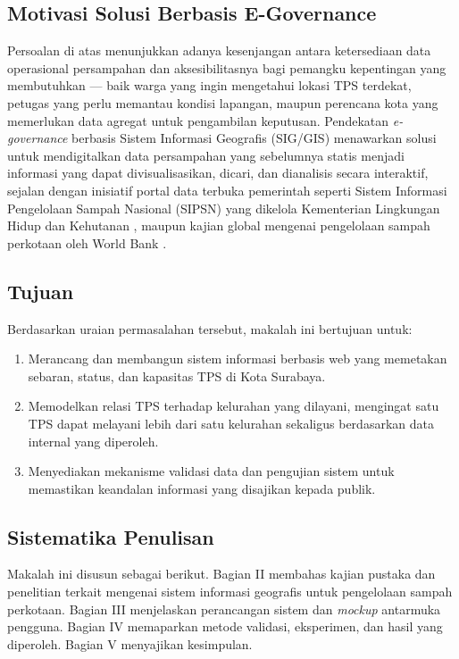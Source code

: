 \documentclass[conference]{IEEEtran}
\begin{document}
\subsection{Motivasi Solusi Berbasis E-Governance}

Persoalan di atas menunjukkan adanya kesenjangan antara ketersediaan
data operasional persampahan dan aksesibilitasnya bagi pemangku
kepentingan yang membutuhkan --- baik warga yang ingin mengetahui
lokasi TPS terdekat, petugas yang perlu memantau kondisi lapangan,
maupun perencana kota yang memerlukan data agregat untuk pengambilan
keputusan. Pendekatan \textit{e-governance} berbasis Sistem Informasi
Geografis (SIG/GIS) menawarkan solusi untuk mendigitalkan data
persampahan yang sebelumnya statis menjadi informasi yang dapat
divisualisasikan, dicari, dan dianalisis secara interaktif, sejalan
dengan inisiatif portal data terbuka pemerintah seperti Sistem
Informasi Pengelolaan Sampah Nasional (SIPSN) yang dikelola Kementerian
Lingkungan Hidup dan Kehutanan \cite{sipsn}, maupun kajian global
mengenai pengelolaan sampah perkotaan oleh World Bank \cite{worldbank}.

\subsection{Tujuan}

Berdasarkan uraian permasalahan tersebut, makalah ini bertujuan untuk:
\begin{enumerate}
    \item Merancang dan membangun sistem informasi berbasis web yang
          memetakan sebaran, status, dan kapasitas TPS di Kota Surabaya.
    \item Memodelkan relasi TPS terhadap kelurahan yang dilayani,
          mengingat satu TPS dapat melayani lebih dari satu kelurahan
          sekaligus berdasarkan data internal yang diperoleh.
    \item Menyediakan mekanisme validasi data dan pengujian sistem
          untuk memastikan keandalan informasi yang disajikan kepada publik.
\end{enumerate}

\subsection{Sistematika Penulisan}

Makalah ini disusun sebagai berikut. Bagian II membahas kajian
pustaka dan penelitian terkait mengenai sistem informasi geografis
untuk pengelolaan sampah perkotaan. Bagian III menjelaskan perancangan
sistem dan \textit{mockup} antarmuka pengguna. Bagian IV memaparkan
metode validasi, eksperimen, dan hasil yang diperoleh. Bagian V
menyajikan kesimpulan.
\end{document}
